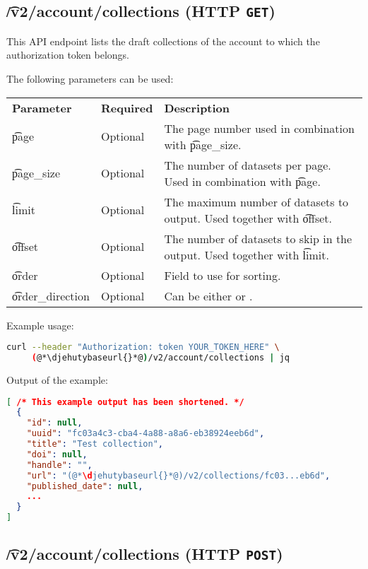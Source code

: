 \subsection{\t{/v2/account/collections} (HTTP \texttt{GET})}

  This API endpoint lists the draft collections of the account to which the
  authorization token belongs.

  The following parameters can be used:

\begin{tabularx}{\textwidth}{*{2}{!{\VRule[-1pt]}l}!{\VRule[-1pt]}X}
  \headrow
  \textbf{Parameter}   & \textbf{Required} & \textbf{Description}\\
  \t{page}             & Optional & The page number used in combination with
                                    \t{page\_size}.\\
  \t{page\_size}       & Optional & The number of datasets per page.  Used
                                    in combination with \t{page}.\\
  \t{limit}            & Optional & The maximum number of datasets to output.
                                    Used together with \t{offset}.\\
  \t{offset}           & Optional & The number of datasets to skip in the
                                    output.  Used together with \t{limit}.\\
  \t{order}            & Optional & Field to use for sorting.\\
  \t{order\_direction} & Optional & Can be either  or .
\end{tabularx}

  Example usage:
\begin{lstlisting}[language=bash]
curl --header "Authorization: token YOUR_TOKEN_HERE" \
     (@*\djehutybaseurl{}*@)/v2/account/collections | jq
\end{lstlisting}

  Output of the example:
\begin{lstlisting}[language=JSON]
[ /* This example output has been shortened. */
  {
    "id": null,
    "uuid": "fc03a4c3-cba4-4a88-a8a6-eb38924eeb6d",
    "title": "Test collection",
    "doi": null,
    "handle": "",
    "url": "(@*\djehutybaseurl{}*@)/v2/collections/fc03...eb6d",
    "published_date": null,
    ...
  }
]
\end{lstlisting}

\subsection{\t{/v2/account/collections} (HTTP \texttt{POST})}

